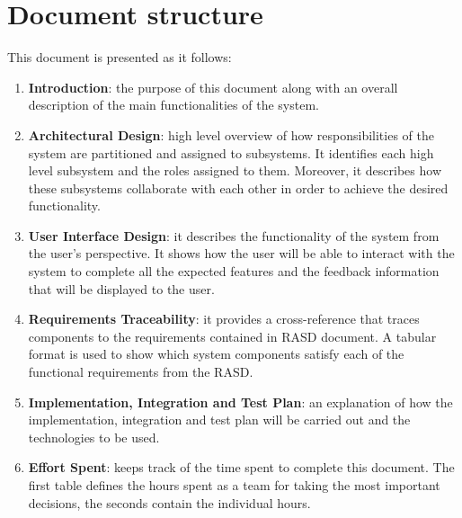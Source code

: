 \section{Document structure}
This document is presented as it follows:
\begin{enumerate}
	\item \textbf{Introduction}: the purpose of this document along with an overall description of the main functionalities of the system.

	\item \textbf{Architectural Design}: high level overview of how	responsibilities of the system are partitioned and assigned to subsystems. It identifies each high level subsystem and the roles assigned to them. Moreover, it describes how these subsystems collaborate with each other in order to achieve the desired functionality.

	\item \textbf{User Interface Design}: it describes the functionality of the system from the user’s perspective. It shows how the user will be able to interact with the system to complete all the expected features and the feedback information that will be displayed to the user.

	\item \textbf{Requirements Traceability}: it provides a cross-reference that traces components to the requirements contained in RASD document. A tabular format is used to show which system components satisfy each of the functional requirements from the RASD.	

    \item \textbf{Implementation, Integration and Test Plan}: an explanation of how the implementation, integration and test plan will be carried out and the technologies to be used.

	\item \textbf{Effort Spent}: keeps track of the time spent to complete this document. The first table defines the hours spent as a team for taking the most important decisions, the seconds contain the individual hours.
\end{enumerate}
